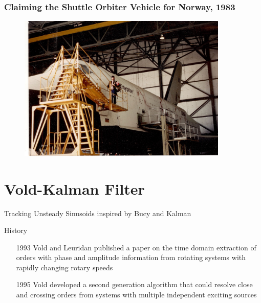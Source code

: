 \documentclass[aspectratio=169,10pt]{beamer} \mode<presentation>
\begin{document}
\begin{frame}
  \frametitle{Claiming the Shuttle Orbiter Vehicle for Norway, 1983}
  \begin{figure}
    \centering
    \includegraphics[width=0.65\linewidth,height=7cm]{Shuttle-1983}
  \end{figure}
\end{frame}

\section{Vold-Kalman Filter}
\begin{frame}[t]{Tracking Unsteady Sinusoids inspired by Bucy and Kalman}
 \begin{block}{History}
   \begin{itemize}[<+->]
    \item[ 1993] Vold and Leuridan published a paper on the time domain extraction of orders with phase and amplitude information from rotating systems with rapidly changing rotary speeds
    \item[ 1995] Vold developed a second generation algorithm that could resolve close and crossing orders from systems with multiple independent exciting sources
  \end{itemize}
 \end{block} 
\end{frame}
\end{document}
